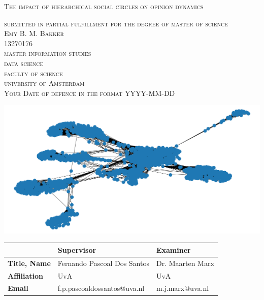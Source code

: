 
\begin{titlepage}


\begin{center}
 
\textsc{\Large   The impact of hierarchical social circles on opinion dynamics}

\bigskip

\textsc{\large
submitted in partial fulfillment for the degree of master of science\\
%
\bigskip
Emy B. M. Bakker\\
%
13270176\\
%
\bigskip
master information studies\\
%
data science \\
%
faculty of science\\
%
university of Amsterdam\\
%
\bigskip
Your Date of defence in the format YYYY-MM-DD
}

\end{center}
 
\vfill

\begin{center}
\includegraphics[height=.4\textheight]{Style/TitlePages/logos/Facebook_network.png} %
\end{center}

\vfill

\begin{center}
\begin{tabular}{|l||ll|}
\hline
 & \textbf{Supervisor} & \textbf{Examiner}  \\   
 \hline
\textbf{Title, Name} & Fernando Pascoal Dos Santos & Dr. Maarten Marx\\
\textbf{Affiliation} & UvA & UvA\\ 
\textbf{Email} & f.p.pascoaldossantos@uva.nl & m.j.marx@uva.nl \\
\hline
\end{tabular}
\end{center}


\end{titlepage}
